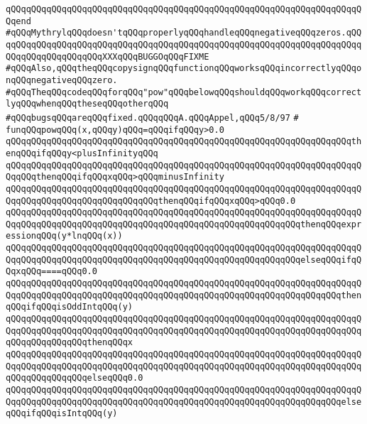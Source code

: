 \verb|qQQqqQQqqQQqqQQqqQQqqQQqqQQqqQQqqQQqqQQqqQQqqQQqqQQqqQQqqQQqqQQqqQQqqQQqend|\newline
\newline
\verb|#qQQqMythrylqQQqdoesn'tqQQqproperlyqQQqhandleqQQqnegativeqQQqzeros.qQQqqQQqqQQqqQQqqQQqqQQqqQQqqQQqqQQqqQQqqQQqqQQqqQQqqQQqqQQqqQQqqQQqqQQqqQQqqQQqqQQqqQQqqQQqXXXqQQqBUGGOqQQqFIXME|\newline
\verb|#qQQqAlso,qQQqtheqQQqcopysignqQQqfunctionqQQqworksqQQqincorrectlyqQQqonqQQqnegativeqQQqzero.|\newline
\verb|#qQQqTheqQQqcodeqQQqforqQQq"pow"qQQqbelowqQQqshouldqQQqworkqQQqcorrectlyqQQqwhenqQQqtheseqQQqotherqQQq|\newline
\verb|#qQQqbugsqQQqareqQQqfixed.qQQqqQQqA.qQQqAppel,qQQq5/8/97|\newline
\verb|#|\newline
\verb|funqQQqpowqQQq(x,qQQqy)qQQq=qQQqifqQQqy>0.0|\newline
\verb|qQQqqQQqqQQqqQQqqQQqqQQqqQQqqQQqqQQqqQQqqQQqqQQqqQQqqQQqqQQqqQQqqQQqthenqQQqifqQQqy<plusInfinityqQQq|\newline
\verb|qQQqqQQqqQQqqQQqqQQqqQQqqQQqqQQqqQQqqQQqqQQqqQQqqQQqqQQqqQQqqQQqqQQqqQQqqQQqthenqQQqifqQQqxqQQq>qQQqminusInfinity|\newline
\verb|qQQqqQQqqQQqqQQqqQQqqQQqqQQqqQQqqQQqqQQqqQQqqQQqqQQqqQQqqQQqqQQqqQQqqQQqqQQqqQQqqQQqqQQqqQQqqQQqqQQqthenqQQqifqQQqxqQQq>qQQq0.0|\newline
\verb|qQQqqQQqqQQqqQQqqQQqqQQqqQQqqQQqqQQqqQQqqQQqqQQqqQQqqQQqqQQqqQQqqQQqqQQqqQQqqQQqqQQqqQQqqQQqqQQqqQQqqQQqqQQqqQQqqQQqqQQqqQQqqQQqthenqQQqexpressionqQQq(y*lnqQQq(x))|\newline
\verb|qQQqqQQqqQQqqQQqqQQqqQQqqQQqqQQqqQQqqQQqqQQqqQQqqQQqqQQqqQQqqQQqqQQqqQQqqQQqqQQqqQQqqQQqqQQqqQQqqQQqqQQqqQQqqQQqqQQqqQQqqQQqqQQqelseqQQqifqQQqxqQQq====qQQq0.0|\newline
\verb|qQQqqQQqqQQqqQQqqQQqqQQqqQQqqQQqqQQqqQQqqQQqqQQqqQQqqQQqqQQqqQQqqQQqqQQqqQQqqQQqqQQqqQQqqQQqqQQqqQQqqQQqqQQqqQQqqQQqqQQqqQQqqQQqqQQqqQQqthenqQQqifqQQqisOddIntqQQq(y)|\newline
\verb|qQQqqQQqqQQqqQQqqQQqqQQqqQQqqQQqqQQqqQQqqQQqqQQqqQQqqQQqqQQqqQQqqQQqqQQqqQQqqQQqqQQqqQQqqQQqqQQqqQQqqQQqqQQqqQQqqQQqqQQqqQQqqQQqqQQqqQQqqQQqqQQqqQQqqQQqqQQqthenqQQqx|\newline
\verb|qQQqqQQqqQQqqQQqqQQqqQQqqQQqqQQqqQQqqQQqqQQqqQQqqQQqqQQqqQQqqQQqqQQqqQQqqQQqqQQqqQQqqQQqqQQqqQQqqQQqqQQqqQQqqQQqqQQqqQQqqQQqqQQqqQQqqQQqqQQqqQQqqQQqqQQqqQQqelseqQQq0.0|\newline
\verb|qQQqqQQqqQQqqQQqqQQqqQQqqQQqqQQqqQQqqQQqqQQqqQQqqQQqqQQqqQQqqQQqqQQqqQQqqQQqqQQqqQQqqQQqqQQqqQQqqQQqqQQqqQQqqQQqqQQqqQQqqQQqqQQqqQQqqQQqelseqQQqifqQQqisIntqQQq(y)|\newline
